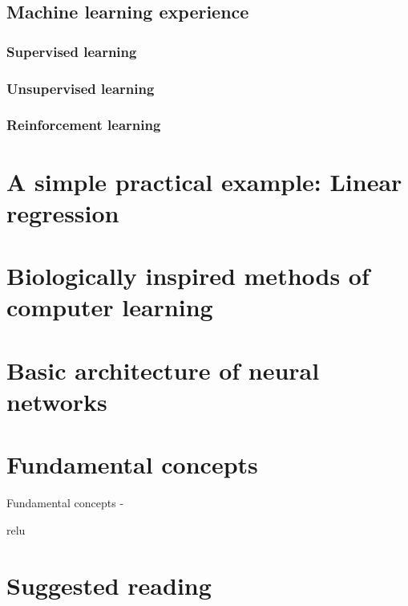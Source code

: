 \subsection{Machine learning experience}

\subsubsection{Supervised learning}

\subsubsection{Unsupervised learning}

\subsubsection{Reinforcement learning}


\section{A simple practical example: Linear regression}


\section{Biologically inspired methods of computer learning}

\section{Basic architecture of neural networks}

\section{Fundamental concepts}
\begin{frame}[t,allowframebreaks]{Fundamental concepts - }

    \gls{relu}
\end{frame}






\section{Suggested reading}




